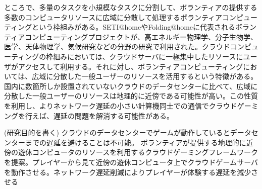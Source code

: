 ところで、多量のタスクを小規模なタスクに分割して、ボランティアの提供する多数のコンピュータリソースに広域に分散して処理するボランティアコンピューティングという枠組みがある。SETI@home\cite{setiathome}やFolding@home\cite{folding}に代表されるボランティアコンピューティングプロジェクトが、高エネルギー物理学、分子生物学、医学、天体物理学、気候研究などの分野の研究で利用された。クラウドコンピューティングの枠組みにおいては、クラウドサーバに一極集中したリソースにユーザがアクセスして利用する。それに対し、ボランティアコンピューティングにおいては、広域に分散した一般ユーザーのリソースを活用するという特徴がある。国内に数箇所しか設置されていないクラウドのデータセンターに比べて、広域に分散した一般ユーザーのリソースは地理的に近傍である可能性が高い。この性質を利用し、よりネットワーク遅延の小さい計算機同士での通信でクラウドゲーミングを行えば、遅延の問題を解消する可能性がある。


(研究目的を書く)
クラウドのデータセンターでゲームが動作しているとデータセンターまでの遅延を避けることは不可能。
ボランティアが提供する地理的に近傍の遊休コンピュータのリソースを利用するクラウドゲーミングフレームワークを提案。プレイヤーから見て近傍の遊休コンピュータ上でクラウドゲームサーバを動作させる。ネットワーク遅延削減によりプレイヤーが体験する遅延を減少させる





 
